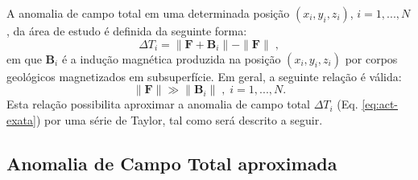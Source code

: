 \documentclass[10pt,a4paper,fleqn]{article}
\begin{document}
A anomalia de campo total em uma determinada posição $(x_{i}, y_{i}, z_{i})$, $i = 1,...,N$,
da \'{a}rea de estudo é definida da seguinte forma:
\begin{equation}
\Delta T_{i} = \| \mathbf{F} + \mathbf{B}_{i} \| - \| \mathbf{F} \| \; ,
\label{eq:act-exata}
\end{equation}
em que $\mathbf{B}_{i}$ é a indução magn\'{e}tica produzida na posição $(x_{i}, y_{i}, z_{i})$
por corpos geol\'{o}gicos magnetizados em subsuperf\'{i}cie. Em geral, a seguinte relaç\~{a}o
\'{e} v\'{a}lida:
\begin{equation}
\| \mathbf{F} \| \gg \| \mathbf{B}_{i} \| \; , \; i = 1,...,N.
\label{eq:f-maior-maior-b}
\end{equation}
Esta relaç\~{a}o possibilita aproximar a anomalia de campo total $\Delta T_{i}$ 
(Eq. \ref{eq:act-exata}) por uma s\'{e}rie de Taylor, tal como será descrito a seguir.

\subsection{Anomalia de Campo Total aproximada}
\end{document}
